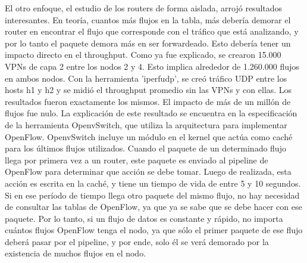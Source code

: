 \documentclass[a4paper,12pt]{report}
\begin{document}
El otro enfoque, el estudio de los routers de forma aislada, arrojó resultados interesantes. En teoría, cuantos más flujos en la tabla, más debería demorar el router en encontrar el flujo que corresponde con el tráfico que está analizando, y por lo tanto el paquete demora más en ser forwardeado. Esto debería tener un impacto directo en el throughput. Como ya fue explicado, se crearon 15.000 VPNs de capa 2 entre los nodos 2 y 4. Esto implica alrededor de 1.260.000 flujos en ambos nodos. Con la herramienta 'iperfudp', se creó tráfico UDP entre los hosts h1 y h2 y se midió el throughput promedio sin las VPNs y con ellas. Los resultados fueron exactamente los mismos. El impacto de más de un millón de flujos fue nulo.
La explicación de este resultado se encuentra en la especificación de la herramienta OpenvSwitch, que utiliza la arquitectura para implementar OpenFlow. OpenvSwitch incluye un módulo en el kernel que actúa como caché para los últimos flujos utilizados. Cuando el paquete de un determinado flujo llega por primera vez a un router, este paquete es enviado al pipeline de OpenFlow para determinar que acción se debe tomar. Luego de realizada, esta acción es escrita en la caché, y tiene un tiempo de vida de entre 5 y 10 segundos. Si en ese período de tiempo llega otro paquete del mismo flujo, no hay necesidad de consultar las tablas de OpenFlow, ya que ya se sabe que se debe hacer con ese paquete. Por lo tanto, si un flujo de datos es constante y rápido, no importa cuántos flujos OpenFlow tenga el nodo, ya que sólo el primer paquete de ese flujo deberá pasar por el pipeline, y por ende, solo él se verá demorado por la existencia de muchos flujos en el nodo.
\\
\end{document}
